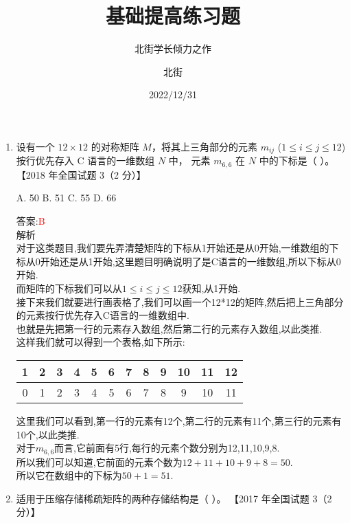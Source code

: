 \documentclass[lang=cn,newtx,10pt,scheme=chinese]{../elegantbook}
\title{基础提高练习题}
\subtitle{北街学长倾力之作}
\author{北街}
\date{2022/12/31}
\begin{document}
\maketitle
\frontmatter

\tableofcontents

\mainmatter

\begin{enumerate}
    \item 设有一个 $12 \times 12$ 的对称矩阵 $M$，将其上三角部分的元素 $m_{ij}$ ($1 \leq i \leq j \leq 12$) 按行优先存入 C 语言的一维数组 $N$ 中，
    元素 $m_{6,6}$ 在 $N$ 中的下标是（ ）。  
    【2018 年全国试题 3（2 分）】  

    A. 50 \quad B. 51 \quad C. 55 \quad D. 66  

    答案:\textcolor{red}{B}\\
    解析\\
    对于这类题目,我们要先弄清楚矩阵的下标从1开始还是从0开始,一维数组的下标从0开始还是从1开始,这里题目明确说明了是C语言的一维数组,所以下标从0开始.\\
    而矩阵的下标我们可以从$1 \leq i \leq j \leq 12$获知,从1开始.\\
    接下来我们就要进行画表格了,我们可以画一个12*12的矩阵,然后把上三角部分的元素按行优先存入C语言的一维数组中.\\
    也就是先把第一行的元素存入数组,然后第二行的元素存入数组,以此类推.\\
    这样我们就可以得到一个表格,如下所示:\\
    \begin{center}
        \begin{tabular}{|c|c|c|c|c|c|c|c|c|c|c|c|}
            \hline
            1 & 2 & 3 & 4 & 5 & 6 & 7 & 8 & 9 & 10 & 11 & 12 \\
            \hline
            0 & 1 & 2 & 3 & 4 & 5 & 6 & 7 & 8 & 9 & 10 & 11 \\

            \hline
            \end{tabular}
    \end{center}
    这里我们可以看到,第一行的元素有12个,第二行的元素有11个,第三行的元素有10个,以此类推.\\
    对于$m_{6,6}$而言,它前面有5行,每行的元素个数分别为12,11,10,9,8.\\
    所以我们可以知道,它前面的元素个数为$12+11+10+9+8=50$.\\
    所以它在数组中的下标为$50+1=51$.\\
    \item 适用于压缩存储稀疏矩阵的两种存储结构是（ ）。  
    【2017 年全国试题 3（2 分）】  


\end{enumerate}
\end{document}
